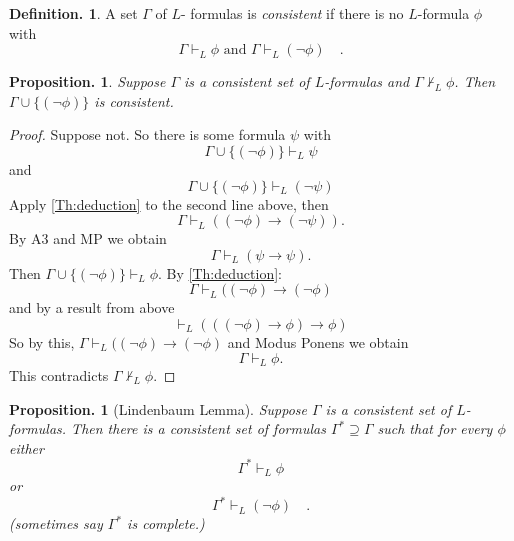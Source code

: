 \documentclass[a4paper,oneside,11pt,DIV=12,parskip=half]{scrartcl}
\theoremstyle{plain}
\newtheorem{proposition}[theorem]{Proposition.}
\theoremstyle{definition}
\newtheorem{definition}[theorem]{Definition.}
\newtheorem{remark, definition}[theorem]{Remark and Definition.}
\newtheorem{lemma, definition}[theorem]{Lemma and Definition.}
\newtheorem{theorem, definition}[theorem]{Theorem and Definition.}
\theoremstyle{remark}
\newtheorem*{remark, example}{\textbf{Remark and Exercise}}
\begin{document}
\begin{definition}
A set $\Gamma$ of $L$- formulas is \emph{consistent} if there is no $L$-formula $\phi$ with
    \[\Gamma \vdash_L \phi \text{ and } \Gamma \vdash_L (\lnot \phi) \quad . \]
\end{definition}

\begin{proposition}\label{TH:extension}
Suppose $\Gamma$ is a consistent set of $L$-formulas and $\Gamma \not \vdash_L \phi$. Then $\Gamma \cup \{(\lnot \phi)\}$ is consistent.
\end{proposition}
\begin{proof}
Suppose not. So there is some formula $\psi$ with
\[ \Gamma \cup \{(\lnot \phi) \} \vdash_L \psi \] and
\[ \Gamma \cup \{(\lnot \phi) \} \vdash_L (\lnot \psi) \]
Apply \ref{Th:deduction} to the second line above, then
\[ \Gamma \vdash_L ((\lnot \phi) \rightarrow (\lnot \psi)). \]
By A3 and MP we obtain
\[ \Gamma \vdash_L (\psi \rightarrow \psi). \]
Then $\Gamma \cup \{(\lnot \phi) \} \vdash_L \phi$. By \ref{Th:deduction}: 
\[ \Gamma \vdash_L ((\lnot \phi) \rightarrow (\lnot \phi)  \]
and by a result from above
    \[ \vdash_L (((\lnot \phi) \rightarrow \phi) \rightarrow \phi) \]
So by this, $ \Gamma \vdash_L ((\lnot \phi) \rightarrow (\lnot \phi)$   and Modus Ponens we obtain
\[ \Gamma \vdash_L \phi. \]
This contradicts $\Gamma \not \vdash_L \phi$.
\end{proof}

\begin{proposition}[Lindenbaum Lemma]
Suppose $\Gamma$ is a consistent set of $L$-formulas. Then there is a consistent set of formulas
$ \Gamma^* \supseteq \Gamma$ such that for every $\phi$ either
    \[\Gamma^* \vdash_L \phi \] or
    \[\Gamma^* \vdash_L (\lnot \phi) \quad . \]
    (sometimes say $\Gamma^*$ is \emph{complete}.) 
\end{proposition}
\end{document}
